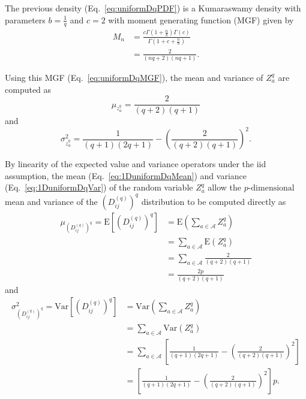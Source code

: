 \documentclass[aoas]{imsart}
\begin{document}
The previous density (Eq.~\ref{eq:uniformDqPDF}) is a Kumaraswamy density with parameters $b = \frac{1}{q}$ and $c = 2$ with moment generating function (MGF) given by
%
\begin{equation}\label{eq:uniformDqMGF}
\begin{aligned}
M_n &=  \frac{c\Gamma\left(1 + \frac{n}{b}\right) \Gamma(c)}{\Gamma\left(1 + c + \frac{n}{b}\right)}\\
&= \frac{2}{(nq + 2)(nq + 1)}.
\end{aligned}
\end{equation}

Using this MGF (Eq.~\ref{eq:uniformDqMGF}), the mean and variance of $Z^q_a$ are computed as
%
\begin{equation}\label{eq:1DuniformDqMean}
\mu_{z^q_a} = \frac{2}{(q + 2)(q + 1)}
\end{equation}
%
and
%
\begin{equation}\label{eq:1DuniformDqVar}
\sigma^2_{z^q_a} = \frac{1}{(q + 1)(2q + 1)} - \left(\frac{2}{(q + 2)(q + 1)}\right)^2.
\end{equation}

By linearity of the expected value and variance operators under the iid assumption, the mean (Eq.~\ref{eq:1DuniformDqMean}) and variance (Eq.~\ref{eq:1DuniformDqVar}) of the random variable $Z^q_a$ allow the $p \text{-dimensional}$ mean and variance of the $\left(D^{(q)}_{ij}\right)^q$ distribution to be computed directly as
%
\begin{equation}\label{eq:uniformDqMean}
\begin{split}
\mu_{\left(D^{(q)}_{ij}\right)^q} = \text{E}\left[\left(D^{(q)}_{ij}\right)^q\right] &= \text{E}\left(\sum_{a \in \mathcal{A}}Z^q_a\right) \\
&= \sum_{a \in \mathcal{A}} \text{E}(Z^q_a) \\
&= \sum_{a \in \mathcal{A}} \frac{2}{(q + 2)(q + 1)} \\
&= \frac{2p}{(q + 2)(q + 1)}
\end{split}
\end{equation}
%
and
%
\begin{equation}\label{eq:uniformDqVar}
\begin{split}
\sigma^2_{\left(D^{(q)}_{ij}\right)^q} = \text{Var}\left[\left(D^{(q)}_{ij}\right)^q\right] &= \text{Var}\left(\sum_{a \in \mathcal{A}} Z^q_a\right) \\
&= \sum_{a \in \mathcal{A}} \text{Var}\left(Z^q_a\right) \\
&= \sum_{a \in \mathcal{A}} \left[\frac{1}{(q + 1)(2q + 1)} - \left(\frac{2}{(q + 2)(q + 1)}\right)^2\right] \\
&= \left[\frac{1}{(q + 1)(2q + 1)} - \left(\frac{2}{(q + 2)(q + 1)}\right)^2\right]p.
\end{split}
\end{equation}
\end{document}
